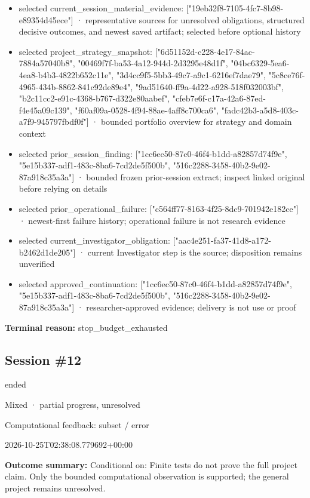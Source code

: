 \documentclass[11pt]{article}
\begin{document}
\begin{itemize}
\item selected current\_session\_material\_evidence: ["19eb32f8-7105-4fc7-8b98-e89354d45ece"] · representative sources for unresolved obligations, structured decisive outcomes, and newest saved artifact; selected before optional history
\item selected project\_strategy\_snapshot: ["6d51152d-c228-4e17-84ac-7884a57040b8", "00469f7f-ba53-4a12-944d-2d3295e48d1f", "04bc6329-5ea6-4ea8-b4b3-4822b652c11e", "3d4cc9f5-5bb3-49c7-a9c1-6216ef7dae79", "5c8ce76f-4965-434b-8862-841c92de89e4", "9ad51640-ff9a-4d22-a928-518f032003bf", "b2c11cc2-e91c-4368-b767-d322e80aabef", "cfeb7e6f-c17a-42a6-87ed-f4e45a09c139", "f60af09a-0528-4f94-88ae-4aff8c700ca6", "fadc42b3-a5d8-403c-a7f9-945797fbdf0f"] · bounded portfolio overview for strategy and domain context
\item selected prior\_session\_finding: ["1cc6ec50-87c0-46f4-b1dd-a82857d74f9e", "5e15b337-adf1-483c-8ba6-7cd2de5f500b", "516c2288-3458-40b2-9e02-87a918c35a3a"] · bounded frozen prior-session extract; inspect linked original before relying on details
\item selected prior\_operational\_failure: ["c564ff77-8163-4f25-8dc9-701942e182ce"] · newest-first failure history; operational failure is not research evidence
\item selected current\_investigator\_obligation: ["aac4e251-fa37-41d8-a172-b2462d1de205"] · current Investigator step is the source; disposition remains unverified
\item selected approved\_continuation: ["1cc6ec50-87c0-46f4-b1dd-a82857d74f9e", "5e15b337-adf1-483c-8ba6-7cd2de5f500b", "516c2288-3458-40b2-9e02-87a918c35a3a"] · researcher-approved evidence; delivery is not use or proof
\end{itemize}
\textbf{Terminal reason:} stop\_budget\_exhausted\par
\subsection{Session \#12}
\begin{description}[style=nextline,font=\normalfont\bfseries,leftmargin=0pt,labelsep=0pt]
\item[Execution status] ended
\item[Outcome] Mixed · partial progress, unresolved
\item[Strategy] Computational feedback: subset / error
\item[Started] 2026-10-25T02:38:08.779692+00:00
\end{description}
\textbf{Outcome summary:} Conditional on: Finite tests do not prove the full project claim. Only the bounded computational observation is supported; the general project remains unresolved.\par
\end{document}
